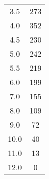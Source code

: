 \begin{table}[h]
\begin{tabular}{S[table-format=2.1] c}
        3.5   &      273\\
        4.0   &      352\\
        4.5   &      230\\
        5.0   &      242\\
        5.5   &      219\\
        6.0   &      199\\
        7.0   &      155\\
        8.0   &      109\\
        9.0   &      72 \\
        10.0  &      40 \\
        11.0  &      13 \\
        12.0  &      0  \\
        \bottomrule
      \end{tabular}
    \end{table}
  
